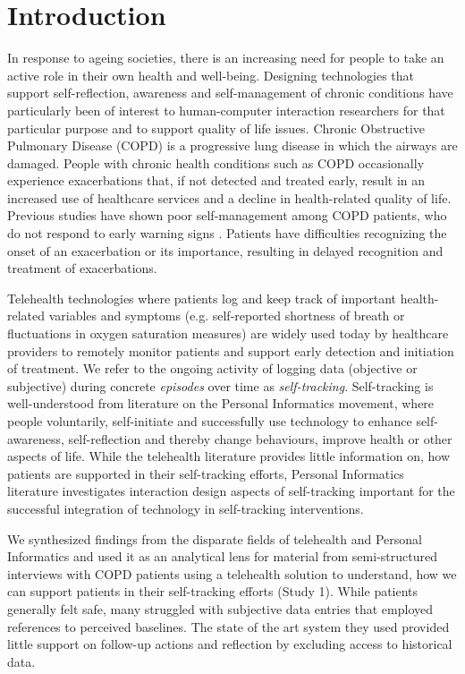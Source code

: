 \section{Introduction}
In response to ageing societies, there is an increasing need for people to take an active role in their own health and well-being. Designing technologies that support self-reflection, awareness and self-management of chronic conditions have particularly been of interest to human-computer interaction researchers for that particular purpose and to support quality of life issues. Chronic Obstructive Pulmonary Disease (COPD) is a progressive lung disease in which the airways are damaged. People with chronic health conditions such as COPD occasionally experience exacerbations that, if not detected and treated early, result in an increased use of healthcare services and a decline in health-related quality of life. Previous studies have shown poor self-management among COPD patients, who do not respond to early warning signs \cite{piloting, proactive, third}. Patients have difficulties recognizing the onset of an exacerbation or its importance, resulting in delayed recognition and treatment of exacerbations. 

Telehealth technologies where patients log and keep track of important health-related variables and symptoms (e.g. self-reported shortness of breath or fluctuations in oxygen saturation measures) are widely used today by healthcare providers to remotely monitor patients and support early detection and initiation of treatment. We refer to the ongoing activity of logging data (objective or subjective) during concrete \textit{episodes} over time as \textit{self-tracking}. Self-tracking is well-understood from literature on the Personal Informatics movement, where people voluntarily, self-initiate and successfully use technology to enhance self-awareness, self-reflection and thereby change behaviours, improve health or other aspects of life. While the telehealth literature provides little information on, how patients are supported in their self-tracking efforts, Personal Informatics literature investigates interaction design aspects of self-tracking important for the successful integration of technology in self-tracking interventions. 

We synthesized findings from the disparate fields of telehealth and Personal Informatics and used it as an analytical lens for material from semi-structured interviews with COPD patients using a telehealth solution to understand, how we can support patients in their self-tracking efforts (Study 1). While patients generally felt safe, many struggled with subjective data entries that employed references to perceived baselines. The state of the art system they used provided little support on follow-up actions and reflection by excluding access to historical data. 

